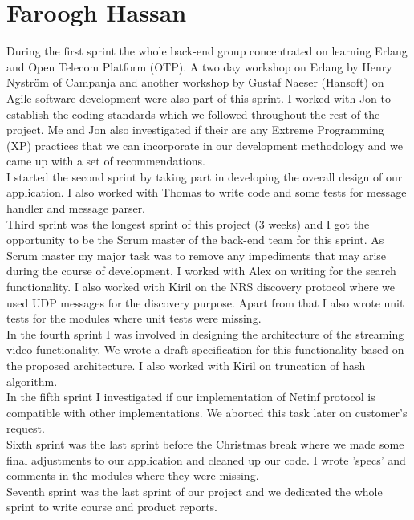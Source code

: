\section{Faroogh Hassan}

During the first sprint the whole back-end group concentrated on learning Erlang and Open Telecom Platform (OTP). A two day workshop on Erlang by Henry Nystr\"om of Campanja and another workshop by Gustaf Naeser (Hansoft) on Agile software development were also part of this sprint. I worked with Jon to establish the coding standards which we followed throughout the rest of the project. Me and Jon also investigated if their are any Extreme Programming (XP) practices that we can incorporate in our development methodology and we came up with a set of recommendations. \\

I started the second sprint by taking part in developing the overall design of our application. I also worked with Thomas to write code and some tests for message handler and message parser.\\

Third sprint was the longest sprint of this project (3 weeks) and I got the opportunity to be the Scrum master of the back-end team for this sprint. As Scrum master my major task was to remove any impediments that may arise during the course of development. I worked with Alex on writing for the search functionality. I also worked with Kiril on the NRS discovery protocol where we used UDP messages for the discovery purpose. Apart from that I also wrote unit tests for the modules where unit tests were missing. \\

In the fourth sprint I was involved in designing the architecture of the streaming video functionality. We wrote a draft specification for this functionality based on the proposed architecture. I also worked with Kiril on truncation of hash algorithm. \\

In the fifth sprint I investigated if our implementation of Netinf protocol is compatible with other implementations. We aborted this task later on customer's request. \\

Sixth sprint was the last sprint before the Christmas break where we made some final adjustments to our application and cleaned up our code. I wrote 'specs' and comments in the modules where they were missing. \\

Seventh sprint was the last sprint of our project and we dedicated the whole sprint to write course and product reports. \\
